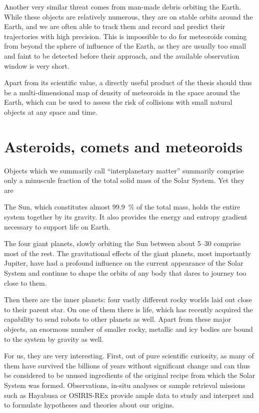     Another very similar threat comes from man-made debris orbiting the Earth.
    While these objects are relatively numerous, they are on stable orbits around
    the Earth, and we are often able to track them and record and predict their trajectories with high precision.
    This is impossible to do for meteoroids coming from beyond the sphere of influence of the Earth,
    as they are usually too small and faint to be detected before their approach,
    and the available observation window is very short.

    Apart from its scientific value, a directly useful product of the thesis should thus
    be a multi-dimensional map of density of meteoroids in the space around the Earth,
    which can be used to assess the risk of collisions with small natural objects
    at any space and time.

\section{Asteroids, comets and meteoroids} \label{ia}
    Objects which we summarily call ``interplanetary matter'' summarily comprise only a minuscule fraction of
    the total solid mass of the Solar System. Yet they are 


    The Sun, which constitutes almost \SI{99.9}{\percent} of the total mass, holds the entire
    system together by its gravity. It also provides the energy and entropy gradient necessary
    to support life on Earth.

    The four giant planets, slowly orbiting the Sun between about \SIrange[range-phrase = {\ and\ }]{5}{30}{\au}
    comprise most of the rest. The gravitational effects of the giant planets, most importantly Jupiter,
    have had a profound influence on the current appearance of the Solar System and continue to
    shape the orbits of any body that dares to journey too close to them.

    Then there are the inner planets: four vastly different rocky worlds laid out
    close to their parent star. On one of them there is life,
    which has recently acquired the capability to send robots to other planets as well.
    Apart from these major objects, an enormous number of smaller rocky, metallic and icy
    bodies are bound to the system by gravity as well.

    For us, they are very interesting. First, out of pure scientific curiosity, as many of them
    have survived the billions of years without significant change and can thus be considered
    to be unused ingredients of the original recipe from which the Solar System was formed.
    Observations, in-situ analyses or sample retrieval missions such as Hayabusa or OSIRIS-REx
    provide ample data to study and interpret and to formulate hypotheses and theories about our origins.

